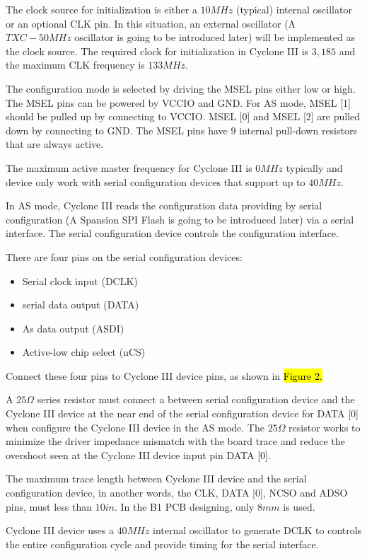 The clock source for initialization is either a $10MHz$ (typical) internal oscillator or an optional CLK pin. In this situation, an external oscillator (A $TXC-50MHz$ oscillator is going to be introduced later) will be implemented as the clock source. The required clock for initialization in Cyclone III is $3,185$ and the maximum CLK frequency is $133MHz$.

The configuration mode is selected by driving the MSEL pins either low or high. The MSEL pins can be powered by VCCIO and GND. For AS mode, MSEL [1] should be pulled up by connecting to VCCIO. MSEL [0] and MSEL [2] are pulled down by connecting to GND. The MSEL pins have $9$ internal pull-down resistors that are always active.

The maximum active master frequency for Cyclone III is $0MHz$ typically and device only work with serial configuration devices that support up to $40MHz$.

In AS mode, Cyclone III reads the configuration data providing by serial configuration (A Spansion SPI Flash is going to be introduced later) via a serial interface. The serial configuration device controls the configuration interface.

There are four pins on the serial configuration devices:
\begin{itemize}
 \item Serial clock input (DCLK)
 \item serial data output (DATA)
 \item As data output (ASDI)
 \item Active-low chip select (nCS)
\end{itemize}

Connect these four pins to Cyclone III device pins, as shown in \hl{Figure 2.}


A $25\Omega$ series resistor must connect a between serial configuration device and the Cyclone III device at the near end of the serial configuration device for DATA [0] when configure the Cyclone III device in the AS mode. The $25\Omega$ resistor works to minimize the driver impedance mismatch with the board trace and reduce the overshoot seen at the Cyclone III device input pin DATA [0].

The maximum trace length between Cyclone III device and the serial configuration device, in another words, the CLK, DATA [0], NCSO and ADSO pins, must less than $10in$. In the B1 PCB designing, only $8mm$ is used.

Cyclone III device uses a $40MHz$ internal oscillator to generate DCLK to controls the entire configuration cycle and provide timing for the serial interface.

